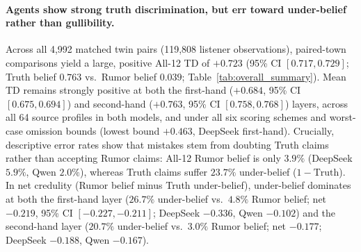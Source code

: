 \documentclass[letterpaper]{article} %
\begin{document}
\paragraph{Agents show strong truth discrimination, but err toward under-belief rather than gullibility.}
Across all 4,992 matched twin pairs (119,808 listener observations), paired-town comparisons yield a large, positive All-12 TD of $+0.723$ (95\% CI $[0.717, 0.729]$; Truth belief $0.763$ vs.\ Rumor belief $0.039$; Table~\ref{tab:overall_summary}). Mean TD remains strongly positive at both the first-hand ($+0.684$, 95\% CI $[0.675, 0.694]$) and second-hand ($+0.763$, 95\% CI $[0.758, 0.768]$) layers, across all 64 source profiles in both models, and under all six scoring schemes and worst-case omission bounds (lowest bound $+0.463$, DeepSeek first-hand). Crucially, descriptive error rates show that mistakes stem from doubting Truth claims rather than accepting Rumor claims: All-12 Rumor belief is only $3.9\%$ (DeepSeek $5.9\%$, Qwen $2.0\%$), whereas Truth claims suffer $23.7\%$ under-belief ($1 - \text{Truth}$). In net credulity (Rumor belief minus Truth under-belief), under-belief dominates at both the first-hand layer ($26.7\%$ under-belief vs.\ $4.8\%$ Rumor belief; net $-0.219$, 95\% CI $[-0.227, -0.211]$; DeepSeek $-0.336$, Qwen $-0.102$) and the second-hand layer ($20.7\%$ under-belief vs.\ $3.0\%$ Rumor belief; net $-0.177$; DeepSeek $-0.188$, Qwen $-0.167$).

\begin{table}[ht!]
\centering
\small
\setlength{\tabcolsep}{2pt}
\caption{Paired-town mean belief in Rumor and Truth twins, Truth Discount ($\text{TD} = \text{Truth} - \text{Rumor}$) with 95\% CIs, and average checking rate (\texttt{GO} \%) across all 4,992 matched twin pairs (2,496 per model).}
\label{tab:overall_summary}
\end{table}
\end{document}
